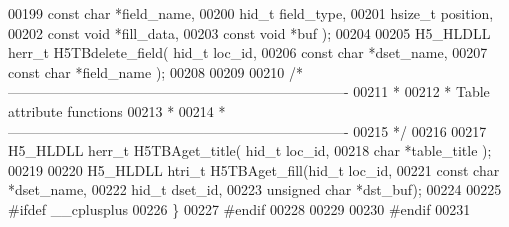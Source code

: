 \begin{DoxyCode}
00199                          \textcolor{keyword}{const} \textcolor{keywordtype}{char} *field\_name,
00200                          hid\_t field\_type,
00201                          hsize\_t position,
00202                          \textcolor{keyword}{const} \textcolor{keywordtype}{void} *fill\_data,
00203                          \textcolor{keyword}{const} \textcolor{keywordtype}{void} *buf );
00204 
00205 H5\_HLDLL herr\_t  H5TBdelete\_field( hid\_t loc\_id,
00206                          \textcolor{keyword}{const} \textcolor{keywordtype}{char} *dset\_name,
00207                          \textcolor{keyword}{const} \textcolor{keywordtype}{char} *field\_name );
00208 
00209 
00210 \textcolor{comment}{/*-------------------------------------------------------------------------}
00211 \textcolor{comment}{ *}
00212 \textcolor{comment}{ * Table attribute functions}
00213 \textcolor{comment}{ *}
00214 \textcolor{comment}{ *-------------------------------------------------------------------------}
00215 \textcolor{comment}{ */}
00216 
00217 H5\_HLDLL herr\_t  H5TBAget\_title( hid\_t loc\_id,
00218                        \textcolor{keywordtype}{char} *table\_title );
00219 
00220 H5\_HLDLL htri\_t  H5TBAget\_fill(hid\_t loc\_id,
00221                       \textcolor{keyword}{const} \textcolor{keywordtype}{char} *dset\_name,
00222                       hid\_t dset\_id,
00223                       \textcolor{keywordtype}{unsigned} \textcolor{keywordtype}{char} *dst\_buf);
00224 
00225 \textcolor{preprocessor}{#ifdef \_\_cplusplus}
00226 \}
00227 \textcolor{preprocessor}{#endif}
00228 
00229 
00230 \textcolor{preprocessor}{#endif}
00231 
\end{DoxyCode}
